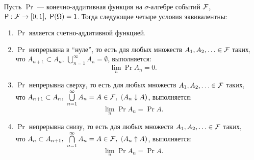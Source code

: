 \begin{theorem}
    Пусть $ \Pr $ --- конечно-аддитивная функция на $ \sigma $-алгебре событий $ \mathcal{F} $, \(\Pr: \F \to [0; 1],\ \Pr(\Omega) = 1 \). Тогда следующие четыре условия эквивалентны:
        \begin{enumerate}[label = (\alph*)]
            \item $ \Pr $ является счетно-аддитивной функцией.
            
            \item $ \Pr $ непрерывна в ``нуле'', то есть для любых множеств \(A_1, A_2, \ldots \in \mathcal{F} \) таких, что \(A_{n + 1} \subset A_n,\ \bigcup\limits_{n = 1}^{\infty}A_n = \emptyset \), выполняется:
            \[
                \lim\limits_{n}\Pr{A_n} = 0.
            \]  
            
            \item $ \Pr $ непрерывна сверху, то есть для любых множеств \(A_1, A_2, \ldots \in \mathcal{F} \) таких, что \(A_{n + 1} \subset A_n,\ \bigcup\limits_{n = 1}^{\infty}A_n = A \in \mathcal{F},\  (A_n \downarrow A) \), выполняется:
            \[
            \lim\limits_{n}\Pr{A_n} = \Pr{A}.
            \]  
            
            \item $ \Pr $ непрерывна снизу, то есть для любых множеств \(A_1, A_2, \ldots \in \mathcal{F} \) таких, что \(A_{n} \subset A_{n + 1},\ \bigcap\limits_{n = 1}^{\infty}A_n = A \in \mathcal{F},\  (A_n \uparrow A) \), выполняется:
            \[
            \lim\limits_{n}\Pr{A_n} = \Pr{A}.
            \]  
            
        \end{enumerate}
\end{theorem}
